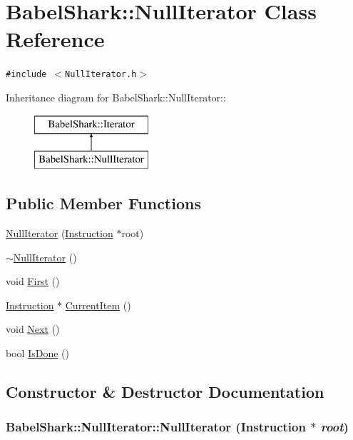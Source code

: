 \hypertarget{class_babel_shark_1_1_null_iterator}{
\section{BabelShark::NullIterator Class Reference}
\label{class_babel_shark_1_1_null_iterator}
}
{\tt \#include $<$NullIterator.h$>$}

Inheritance diagram for BabelShark::NullIterator::\begin{figure}[H]
\begin{center}
\leavevmode
\includegraphics[height=2cm]{class_babel_shark_1_1_null_iterator}
\end{center}
\end{figure}
\subsection*{Public Member Functions}
\begin{CompactItemize}
\item 
\hyperlink{class_babel_shark_1_1_null_iterator_dbba76f2eb633147ce82d7ca01f24f6f}{NullIterator} (\hyperlink{class_babel_shark_1_1_instruction}{Instruction} $\ast$root)
\item 
\hyperlink{class_babel_shark_1_1_null_iterator_74cddf876859c03f0a3525d839e821bf}{$\sim$NullIterator} ()
\item 
void \hyperlink{class_babel_shark_1_1_null_iterator_fed04b8defc217356d99cee6bbcfd97f}{First} ()
\item 
\hyperlink{class_babel_shark_1_1_instruction}{Instruction} $\ast$ \hyperlink{class_babel_shark_1_1_null_iterator_938998731797e1bc1b465d6aeb4fc129}{CurrentItem} ()
\item 
void \hyperlink{class_babel_shark_1_1_null_iterator_66a47f978ee58a3ee639494aac25bb7c}{Next} ()
\item 
bool \hyperlink{class_babel_shark_1_1_null_iterator_660ce1fb9a79f50269015e945d126baf}{IsDone} ()
\end{CompactItemize}


\subsection{Constructor \& Destructor Documentation}
\hypertarget{class_babel_shark_1_1_null_iterator_dbba76f2eb633147ce82d7ca01f24f6f}{
\subsubsection[{NullIterator}]{\setlength{\rightskip}{0pt plus 5cm}BabelShark::NullIterator::NullIterator ({\bf Instruction} $\ast$ {\em root})}}
\label{class_babel_shark_1_1_null_iterator_dbba76f2eb633147ce82d7ca01f24f6f}


